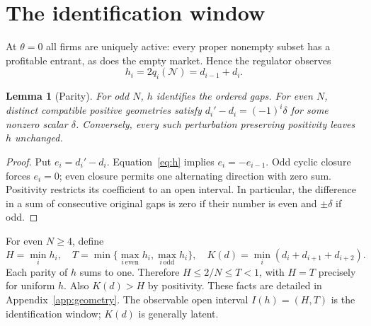 \documentclass[11pt]{article}
\newtheorem{lemma}{Lemma}
\newcommand{\All}{\mathcal N}
\begin{document}
\section{The identification window}
\label{sec:window}
At $\theta=0$ all firms are uniquely active: every proper nonempty subset has a profitable entrant, as does the empty market. Hence the regulator observes
\begin{equation}\label{eq:h}
h_i=2q_i(\All)=d_{i-1}+d_i.
\end{equation}
\begin{lemma}[Parity]\label{lem:parity}
For odd $N$, $h$ identifies the ordered gaps. For even $N$, distinct compatible positive geometries satisfy $d_i'-d_i=(-1)^i\delta$ for some nonzero scalar $\delta$. Conversely, every such perturbation preserving positivity leaves $h$ unchanged.
\end{lemma}
\begin{proof}
Put $e_i=d_i'-d_i$. Equation~\eqref{eq:h} implies $e_i=-e_{i-1}$. Odd cyclic closure forces $e_i=0$; even closure permits one alternating direction with zero sum. Positivity restricts its coefficient to an open interval. In particular, the difference in a sum of consecutive original gaps is zero if their number is even and $\pm\delta$ if odd.
\end{proof}
For even $N\geq4$, define
\begin{equation}\label{eq:window}
H=\min_i h_i,\quad T=\min\{\max_{i\,\mathrm{even}}h_i,\max_{i\,\mathrm{odd}}h_i\},\quad K(d)=\min_i(d_i+d_{i+1}+d_{i+2}).
\end{equation}
Each parity of $h$ sums to one. Therefore $H\leq 2/N\leq T<1$, with $H=T$ precisely for uniform $h$. Also $K(d)>H$ by positivity. These facts are detailed in Appendix~\ref{app:geometry}. The observable open interval $I(h)=(H,T)$ is the identification window; $K(d)$ is generally latent.
\end{document}
